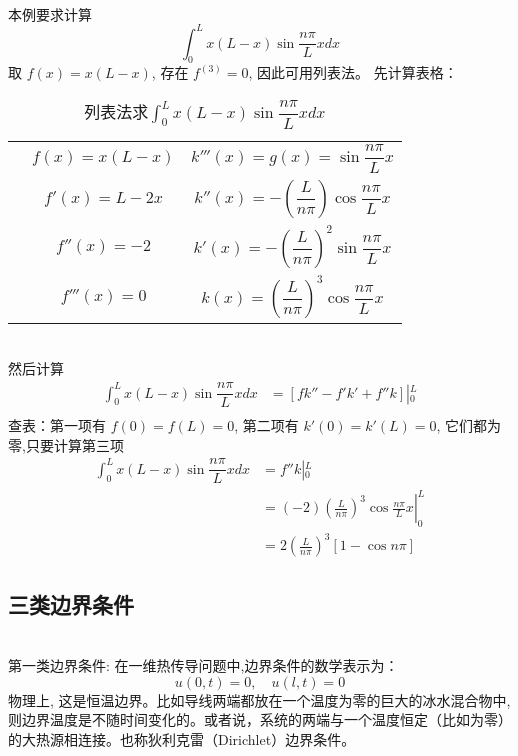 ~~\\
本例要求计算 $$ \int_{0 }^{L} x(L-x) \sin \dfrac{ n\pi }{L} x dx  $$
取 $f(x) = x(L-x)$, 存在 $  f^{(3)} =0  $, 因此可用列表法。  先计算表格： \\
\renewcommand\arraystretch{2}  
\begin{table}[h]
	\caption{列表法求$ \int_{0 }^{L} x(L-x) \sin \dfrac{ n\pi }{L} x dx  $}
	\centering
	\begin{tabular}
	{p{0.5cm}c|c}	
	\toprule
	& $f(x)=x(L-x)$  & $k'''(x)=g(x)= \sin \dfrac{ n\pi }{L} x$ \\
	& $f'(x)=L-2x$  & $k''(x) = -(\dfrac{L}{ n\pi })\cos \dfrac{ n\pi }{L} x$ \\
	& $f''(x)=-2$  & $k'(x) = -(\dfrac{L}{ n\pi })^2 \sin \dfrac{ n\pi }{L} x$ \\
	& $f'''(x)=0$  & $k(x) = (\dfrac{L}{ n\pi })^3 \cos \dfrac{ n\pi }{L} x$ \\
	\bottomrule
	\end{tabular}
\end{table}

~~\\ 
然后计算
$$
\begin{aligned}
	\int_{0 }^{L} x(L-x) \sin \dfrac{ n\pi }{L} x dx &= \left[ fk'' - f'k' + f''k \right]\left\vert _{0 }^{L} \right. \\
\end{aligned}  
$$ 
查表：第一项有 $ f(0)=f(L) =0 $, 第二项有 $ k'(0)=k'(L) =0 $, 它们都为零,只要计算第三项 
$$
\begin{aligned}
	\int_{0 }^{L} x(L-x) \sin \dfrac{ n\pi }{L} x dx &= f''k \left\vert _{0 }^{L} \right. \\
	&= \left.(-2) (\frac{L}{ n\pi })^3 \cos \frac{ n\pi }{L} x \right\vert _{0 }^{L} \\
	&=  2 (\frac{L}{ n\pi })^3 [1 - \cos n\pi]
\end{aligned}  
$$  

\subsection{三类边界条件} ~\\
第一类边界条件: 在一维热传导问题中,边界条件的数学表示为：
\begin{equation}
	u (0,t) =0, \quad u (l,t)=0 
\end{equation}
物理上, 这是恒温边界。比如导线两端都放在一个温度为零的巨大的冰水混合物中, 则边界温度是不随时间变化的。或者说，系统的两端与一个温度恒定（比如为零）的大热源相连接。也称狄利克雷（Dirichlet）边界条件。

